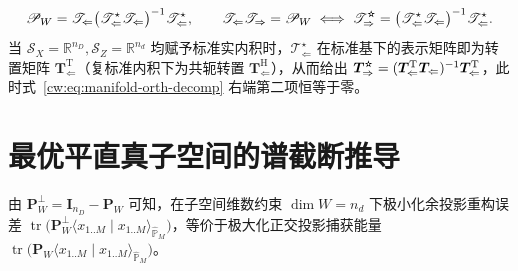 \begin{equation}\label{cw:eq:app-adjoint-proj}
\mathscr P_W=\mathscr T_{\Leftarrow}\bigl(\mathscr T_{\Leftarrow}^{\star}\mathscr T_{\Leftarrow}\bigr)^{-1}\mathscr T_{\Leftarrow}^{\star},\qquad
\mathscr T_{\Leftarrow}\mathscr T_{\Rightarrow}=\mathscr P_W
\iff\mathscr T_{\Rightarrow}^{\optstar}=\bigl(\mathscr T_{\Leftarrow}^{\star}\mathscr T_{\Leftarrow}\bigr)^{-1}\mathscr T_{\Leftarrow}^{\star}.
\end{equation}
当 $\mathcal S_X=\mathbb R^{n_D},\mathcal S_Z=\mathbb R^{n_d}$ 均赋予标准实内积时，$\mathscr T_{\Leftarrow}^{\star}$ 在标准基下的表示矩阵即为转置矩阵 $\bm T_{\Leftarrow}^{\mathrm T}$（复标准内积下为共轭转置 $\bm T_{\Leftarrow}^{\mathrm H}$），从而给出 $\bm T_{\Rightarrow}^{\optstar}=(\bm T_{\Leftarrow}^{\mathrm T}\bm T_{\Leftarrow})^{-1}\bm T_{\Leftarrow}^{\mathrm T}$，此时式~\eqref{cw:eq:manifold-orth-decomp} 右端第二项恒等于零。

\section{最优平直真子空间的谱截断推导}

由 $\bm P_W^{\perp}=\bm I_{n_D}-\bm P_W$ 可知，在子空间维数约束 $\dim W=n_d$ 下极小化余投影重构误差 $\operatorname{tr}\bigl(\bm P_W^{\perp}\langle x_{1..M}\mid x_{1..M}\rangle_{\hat{\mathbb P}_M}\bigr)$，等价于极大化正交投影捕获能量 $\operatorname{tr}\bigl(\bm P_W\langle x_{1..M}\mid x_{1..M}\rangle_{\hat{\mathbb P}_M}\bigr)$。

